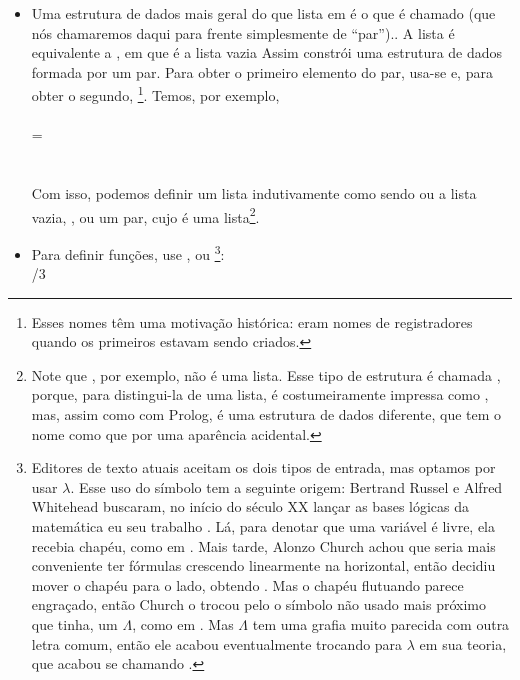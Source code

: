 \begin{itemize}
\item Uma estrutura de dados mais geral do que lista em
   é o que é chamado  (que nós
  chamaremos daqui para frente simplesmente de ``par'').. A lista
   é equivalente a , em que  é a lista
  vazia
    Assim  constrói uma estrutura de
    dados formada por um par. Para obter o primeiro elemento do par,
    usa-se  e, para obter o segundo,
    \footnote{Esses nomes têm uma motivação histórica:
      eram nomes de registradores quando os primeiros
       estavam sendo criados.}. Temos, por exemplo,\\
     \\
     \seta {} =
    \\
     \\
     \seta {}\\
    Com isso, podemos definir um lista indutivamente como sendo ou a
    lista vazia, , ou um par, cujo
     é uma lista\footnote{Note que ,
      por exemplo, não é uma lista. Esse tipo de estrutura é chamada
      , porque, para distingui-la de uma lista, é
      costumeiramente impressa como , mas, assim como
      com Prolog, é uma estrutura de dados diferente, que tem o nome
       como que por uma aparência acidental.}.
\item Para definir funções, use , ou
  \enphasisb{$\lambda$}\footnote{Editores de texto atuais aceitam os dois tipos de
    entrada, mas optamos por usar $\lambda$. Esse uso do símbolo tem a
    seguinte origem: Bertrand Russel e Alfred Whitehead buscaram, no
    início do século XX lançar as bases lógicas da matemática eu seu
    trabalho . Lá, para denotar que uma
    variável é livre, ela recebia chapéu, como em . Mais tarde, Alonzo Church achou que seria mais conveniente
    ter fórmulas crescendo linearmente na horizontal, então decidiu
    mover o chapéu para o lado, obtendo .
    Mas o chapéu flutuando parece engraçado, então Church o trocou
    pelo  o símbolo não usado mais próximo que tinha, um $\Lambda$, como em
    . Mas
    $\Lambda$ tem uma grafia muito parecida com outra letra comum, então
    ele acabou eventualmente trocando para $\lambda$ em sua teoria, que
    acabou se chamando  \cite{norvig}.}:\\
   /3


\end{itemize}
